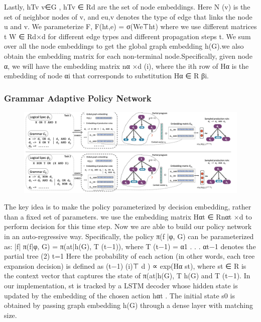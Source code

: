 \documentclass{article}
\begin{document}
Lastly, {hTv }v∈G , hTv ∈ Rd are the set of node embeddings. Here N (v) is the set of neighbor nodes
of v, and eu,v denotes the type of edge that links the node u and v. We parameterize F, F(ht,e) = σ(We⊤ht) where we use different matrices t W ∈ Rd×d for different edge types and different propagation steps t. We sum over all the node embeddings to get the global graph embedding h(G).we also obtain the embedding matrix for each non-terminal node.Specifically, given node α, we will have the embedding matrix nα ×d (i), where the ith row of Hα is the embedding of node αi that corresponds to substitution Hα ∈ R βi.
\subsubsection{Grammar Adaptive Policy Network}
\begin{figure}[ht]
\vskip 0.2in
\begin{center}
\centerline{\includegraphics[width=\columnwidth]{Images/Synthesis1-2.png}}
\label{icml-historical}
\end{center}
\vskip -0.2in
\end{figure}

The key idea is to make the policy parameterized by decision embedding, rather than a fixed set of parameters. we use the embedding matrix Hαt ∈ Rnαt ×d to perform decision for this time step. Now we are able to build our policy network in an auto-regressive way. Specifically, the policy π(f |φ, G) can be parameterized as:
|f| π(f|φ, G) =  π(at|h(G), T (t−1)), where T (t−1) = α1 . . . αt−1 denotes the partial tree (2) t=1
Here the probability of each action (in other words, each tree expansion decision) is defined as
(t−1) (i)⊤ d
) ∝ exp(Hα st), where st ∈ R is the context vector that captures the state of
π(at|h(G), T
h(G) and T (t−1). In our implementation, st is tracked by a LSTM decoder whose hidden state is
updated by the embedding of the chosen action hαt . The initial state s0 is obtained by passing graph embedding h(G) through a dense layer with matching size.
\end{document}
